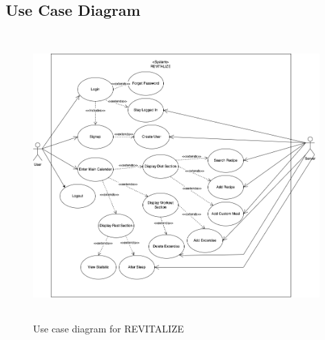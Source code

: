 \documentclass[12pt,letterpaper]{article}
\begin{document}
\subsection{Use Case Diagram}
\begin{figure}[H]
	\centering
	\includegraphics[width=11cm, height=11cm]{4G06SRSUseCaseDiagram.png}
	\caption{Use case diagram for REVITALIZE}
\end{figure}
\end{document}

